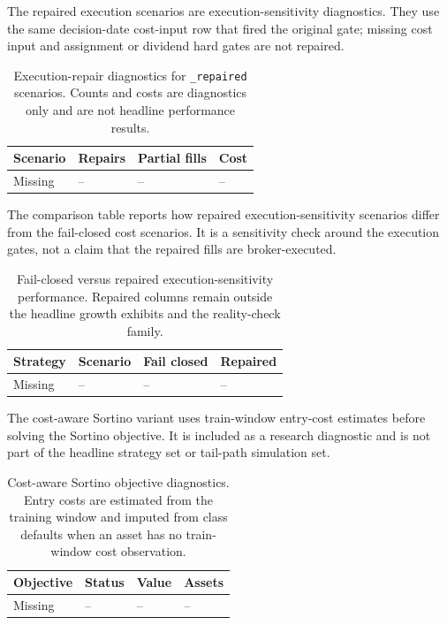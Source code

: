 The repaired execution scenarios are execution-sensitivity diagnostics. They use the same
decision-date cost-input row that fired the original gate; missing cost input and
assignment or dividend hard gates are not repaired.

\begin{table}[H]
\centering
\scriptsize
{}
  {\resizebox{0.86\textwidth}{!}{}}
  {\begin{tabular}{llll}\toprule Scenario & Repairs & Partial fills & Cost \\\midrule Missing & -- & -- & -- \\\bottomrule\end{tabular}}
\caption{Execution-repair diagnostics for \texttt{\_repaired} scenarios. Counts and
costs are diagnostics only and are not headline performance results.}
\label{tab:execution_repair_diagnostics_app}
\end{table}

The comparison table reports how repaired execution-sensitivity scenarios differ from the
fail-closed cost scenarios. It is a sensitivity check around the execution gates, not a
claim that the repaired fills are broker-executed.

\begin{table}[H]
\centering
\scriptsize
{}
  {\resizebox{\textwidth}{!}{}}
  {\begin{tabular}{llll}\toprule Strategy & Scenario & Fail closed & Repaired \\\midrule Missing & -- & -- & -- \\\bottomrule\end{tabular}}
\caption{Fail-closed versus repaired execution-sensitivity performance. Repaired columns
remain outside the headline growth exhibits and the reality-check family.}
\label{tab:execution_repair_comparison_app}
\end{table}

\clearpage

The cost-aware Sortino variant uses train-window entry-cost estimates before solving the
Sortino objective. It is included as a research diagnostic and is not part of the headline
strategy set or tail-path simulation set.

\begin{table}[H]
\centering
\scriptsize
{}
  {\resizebox{0.78\textwidth}{!}{}}
  {\begin{tabular}{llll}\toprule Objective & Status & Value & Assets \\\midrule Missing & -- & -- & -- \\\bottomrule\end{tabular}}
\caption{Cost-aware Sortino objective diagnostics. Entry costs are estimated from the
training window and imputed from class defaults when an asset has no train-window cost
observation.}
\label{tab:sortino_objective_diagnostics_app}
\end{table}

